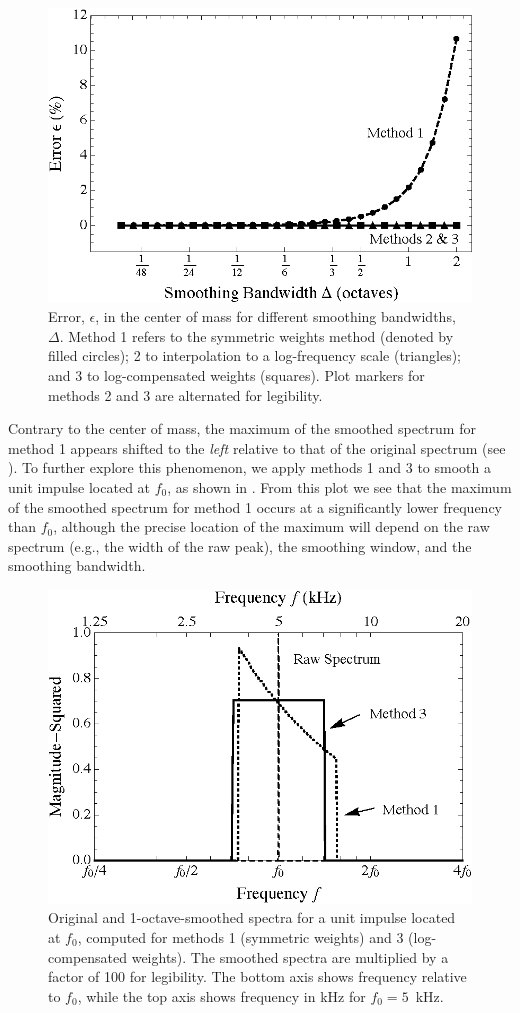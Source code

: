 \begin{figure}[t]
    \centering
    \includegraphics[width=0.6\columnwidth]{a3_smoothing_weights/figures/CenterOfMassAnalysis.eps}
    \caption[Error in the center of mass for different smoothing bandwidths.]{
    Error, $\epsilon$, in the center of mass for different smoothing bandwidths, $\Delta$.
Method 1 refers to the symmetric weights method (denoted by filled circles); 2 to interpolation to a log-frequency scale (triangles); and 3 to log-compensated weights (squares).
Plot markers for methods 2 and 3 are alternated for legibility.}
    \label{fig:A3_Smoothing_Weights:CenterOfMassAnalysis}
\end{figure}

Contrary to the center of mass, the maximum of the smoothed spectrum for method 1 appears shifted to the \textit{left} relative to that of the original spectrum (see ).
To further explore this phenomenon, we apply methods 1 and 3 to smooth a unit impulse located at $f_0$, as shown in .
From this plot we see that the maximum of the smoothed spectrum for method 1 occurs at a significantly lower frequency than $f_0$, although the precise location of the maximum will depend on the raw spectrum (e.g., the width of the raw peak), the smoothing window, and the smoothing bandwidth.

\begin{figure}[t]
    \centering
    \includegraphics[width=0.6\columnwidth]{a3_smoothing_weights/figures/SmoothingImpulseResponse.eps}
    \caption[Original and smoothed spectra for a unit impulse.]{
    Original and 1-octave-smoothed spectra for a unit impulse located at $f_0$, computed for methods 1 (symmetric weights) and 3 (log-compensated weights).
The smoothed spectra are multiplied by a factor of 100 for legibility.
The bottom axis shows frequency relative to $f_0$, while the top axis shows frequency in kHz for $f_0 = 5$~kHz.}
    \label{fig:A3_Smoothing_Weights:SmoothingImpulseResponse}
\end{figure}


